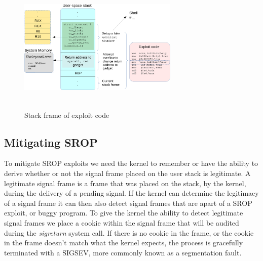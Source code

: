 \documentclass{sig-alternate-05-2015}
\begin{document}
\begin{figure}
\centering
\includegraphics[height=2.5in, width=3in]{5.pdf}
\caption{Stack frame of exploit code}
\label{fig:SFEC}
\end{figure}

\subsection{Mitigating SROP}
To mitigate SROP exploits we need the kernel to remember or have the ability to derive whether or not the signal frame placed on the user stack is legitimate. A legitimate signal frame is a frame that was placed on the stack, by the kernel, during the delivery of a pending signal. If the kernel can determine the legitimacy of a signal frame it can then also detect signal frames that are apart of a SROP exploit, or buggy program. To give the kernel the ability to detect legitimate signal frames we place a cookie within the signal frame that will be audited during the \textit{sigreturn} system call. If there is no cookie in the frame, or the cookie in the frame doesn't match what the kernel expects, the process is gracefully terminated with a SIGSEV, more commonly known as a segmentation fault. 
\end{document}
